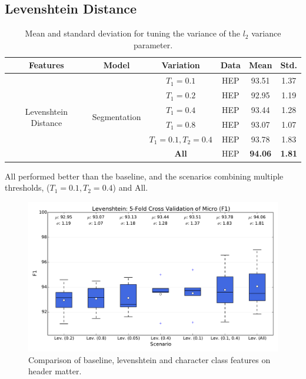 \subsection{Levenshtein Distance}

\begin{table}[h]
\begin{center}
\begin{tabular}{|c|c|c|c|c|c|}
\hline
Features & Model & Variation & Data & Mean & Std.\\
\hline
\multirow{6}{*}{Levenshtein Distance} & \multirow{6}{*}{Segmentation} & $T_1 = 0.1$ & HEP & 93.51 & 1.37\\\cline{3-6}
& & $T_1 = 0.2$ & HEP & 92.95 & 1.19\\\cline{3-6}
& & $T_1 = 0.4$ & HEP & 93.44 & 1.28\\\cline{3-6}
& & $T_1 = 0.8$ & HEP & 93.07 & 1.07\\\cline{3-6}
& & $T_1 = 0.1, T_2 = 0.4$ & HEP & 93.78 & 1.83\\\cline{3-6}
& & \textbf{All} & HEP & \textbf{94.06} & \textbf{1.81}\\\cline{3-6}
\hline
\end{tabular}
\caption[Mean and standard deviation for tuning the variance of the $l_2$ variance parameter.]{Mean and standard deviation for tuning the variance of the $l_2$ variance parameter.}
\label{table:levenshteinresults}
\end{center}
\end{table}

All performed better than the baseline, and the scenarios combining multiple thresholds, ($T_1 = 0.1, T_2 = 0.4$) and All.

\begin{figure}[h]
\center
\includegraphics[width=5.5in]{Figures/levenshtein_micro.pdf}
\caption{Comparison of baseline, levenshtein and character class features on header matter.}
\label{fig:micro}
\end{figure}


